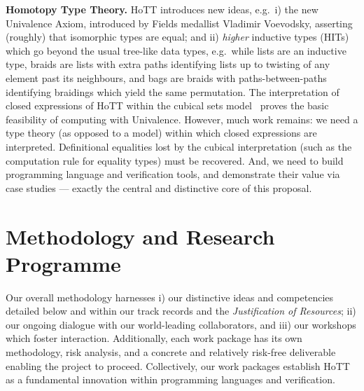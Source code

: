 \documentclass[a4paper,11pt]{article}
\newcommand{\eg}{{e.g.}\ }
\begin{document}
{\bf Homotopy Type Theory.} HoTT introduces new ideas, \eg i) the new
Univalence Axiom, introduced by Fields medallist Vladimir Voevodsky,
asserting (roughly) that isomorphic types are equal; and ii)
\emph{higher} inductive types (HITs) which go beyond the usual
tree-like data types, \eg while lists are an inductive type, braids
are lists with extra paths identifying lists up to twisting of any
element past its neighbours, and bags are braids with
paths-between-paths identifying braidings which yield the same
permutation.  The interpretation of closed expressions of HoTT within
the cubical sets model~\cite{BezemM:cubsmt, nominal} proves the basic
feasibility of computing with Univalence.  However, much work remains:
we need a type theory (as opposed to a model) within which closed
expressions are interpreted.  Definitional equalities lost by the
cubical interpretation (such as the computation rule for equality
types) must be recovered. And, we need to build programming
language and verification tools, and demonstrate their value via case
studies --- exactly the central and distinctive core of this proposal.




\vspace*{-0.2in}

\section{Methodology and Research Programme}
\vspace*{-0.1in}

Our overall methodology harnesses i) our distinctive ideas and
competencies detailed below and within our track records and the {\em
  Justification of Resources}; ii) our ongoing dialogue with our
world-leading collaborators, and iii) our workshops which
foster interaction. Additionally, each work package has its own
methodology, risk analysis, and a concrete and relatively
risk-free deliverable enabling the project to proceed. Collectively,
our work packages establish HoTT as a fundamental innovation within
programming languages and verification.
\end{document}
